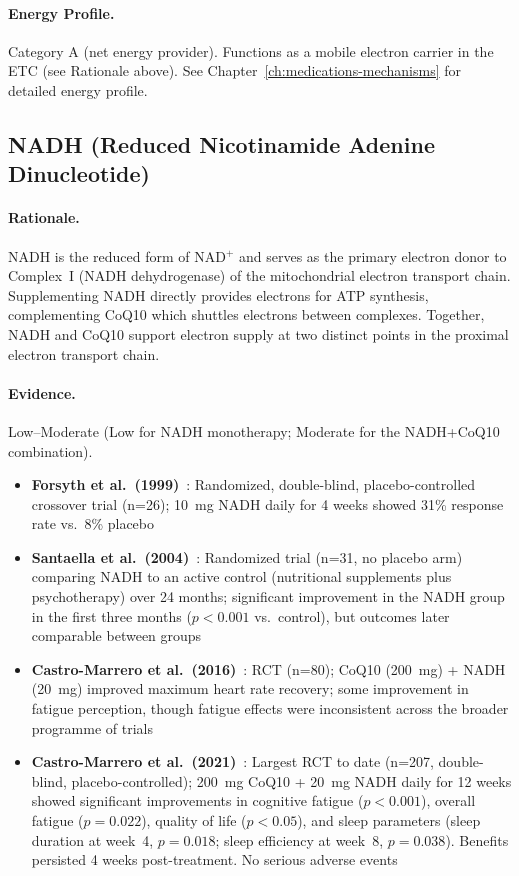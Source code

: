 \paragraph{Energy Profile.}
Category A (net energy provider). Functions as a mobile electron carrier in the ETC (see Rationale above). See Chapter~\ref{ch:medications-mechanisms} for detailed energy profile.

\subsection{NADH (Reduced Nicotinamide Adenine Dinucleotide)}
\label{subsec:nadh-supplement}

\paragraph{Rationale.} NADH is the reduced form of NAD$^+$ and serves as the primary electron donor to Complex~I (NADH dehydrogenase) of the mitochondrial electron transport chain. Supplementing NADH directly provides electrons for ATP synthesis, complementing CoQ10 which shuttles electrons between complexes. Together, NADH and CoQ10 support electron supply at two distinct points in the proximal electron transport chain.

\paragraph{Evidence.} Low--Moderate (Low for NADH monotherapy; Moderate for the NADH+CoQ10 combination).
\begin{itemize}
    \item \textbf{Forsyth et al.\ (1999)}~\cite{Forsyth1999NADH}: Randomized, double-blind, placebo-controlled crossover trial (n=26); 10~mg NADH daily for 4 weeks showed 31\% response rate vs.\ 8\% placebo
    \item \textbf{Santaella et al.\ (2004)}~\cite{Santaella2004NADH}: Randomized trial (n=31, no placebo arm) comparing NADH to an active control (nutritional supplements plus psychotherapy) over 24 months; significant improvement in the NADH group in the first three months ($p < 0.001$ vs.\ control), but outcomes later comparable between groups
    \item \textbf{Castro-Marrero et al.\ (2016)}~\cite{CastroMarrero2016}: RCT (n=80); CoQ10 (200~mg) + NADH (20~mg) improved maximum heart rate recovery; some improvement in fatigue perception, though fatigue effects were inconsistent across the broader programme of trials
    \item \textbf{Castro-Marrero et al.\ (2021)}~\cite{CastroMarrero2021fatigue}: Largest RCT to date (n=207, double-blind, placebo-controlled); 200~mg CoQ10 + 20~mg NADH daily for 12 weeks showed significant improvements in cognitive fatigue ($p < 0.001$), overall fatigue ($p = 0.022$), quality of life ($p < 0.05$), and sleep parameters (sleep duration at week~4, $p = 0.018$; sleep efficiency at week~8, $p = 0.038$). Benefits persisted 4 weeks post-treatment. No serious adverse events
\end{itemize}

